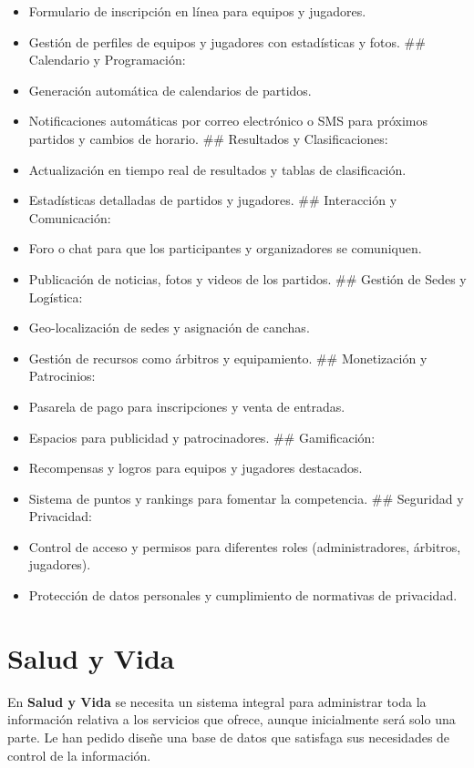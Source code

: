 \documentclass[
  letterpaper,
  DIV=11,
  numbers=noendperiod]{scrreprt}
\providecommand{\tightlist}{%
  \setlength{\itemsep}{0pt}\setlength{\parskip}{0pt}}\usepackage{longtable,booktabs,array}
\begin{document}
\begin{itemize}
\tightlist
\item
  Formulario de inscripción en línea para equipos y jugadores.
\item
  Gestión de perfiles de equipos y jugadores con estadísticas y fotos.
  \#\# Calendario y Programación:
\item
  Generación automática de calendarios de partidos.
\item
  Notificaciones automáticas por correo electrónico o SMS para próximos
  partidos y cambios de horario. \#\# Resultados y Clasificaciones:
\item
  Actualización en tiempo real de resultados y tablas de clasificación.
\item
  Estadísticas detalladas de partidos y jugadores. \#\# Interacción y
  Comunicación:
\item
  Foro o chat para que los participantes y organizadores se comuniquen.
\item
  Publicación de noticias, fotos y videos de los partidos. \#\# Gestión
  de Sedes y Logística:
\item
  Geo-localización de sedes y asignación de canchas.
\item
  Gestión de recursos como árbitros y equipamiento. \#\# Monetización y
  Patrocinios:
\item
  Pasarela de pago para inscripciones y venta de entradas.
\item
  Espacios para publicidad y patrocinadores. \#\# Gamificación:
\item
  Recompensas y logros para equipos y jugadores destacados.
\item
  Sistema de puntos y rankings para fomentar la competencia. \#\#
  Seguridad y Privacidad:
\item
  Control de acceso y permisos para diferentes roles (administradores,
  árbitros, jugadores).
\item
  Protección de datos personales y cumplimiento de normativas de
  privacidad.
\end{itemize}


\chapter{Salud y Vida}\label{salud-y-vida}

En \textbf{Salud y Vida} se necesita un sistema integral para
administrar toda la información relativa a los servicios que ofrece,
aunque inicialmente será solo una parte. Le han pedido diseñe una base
de datos que satisfaga sus necesidades de control de la información.
\end{document}
